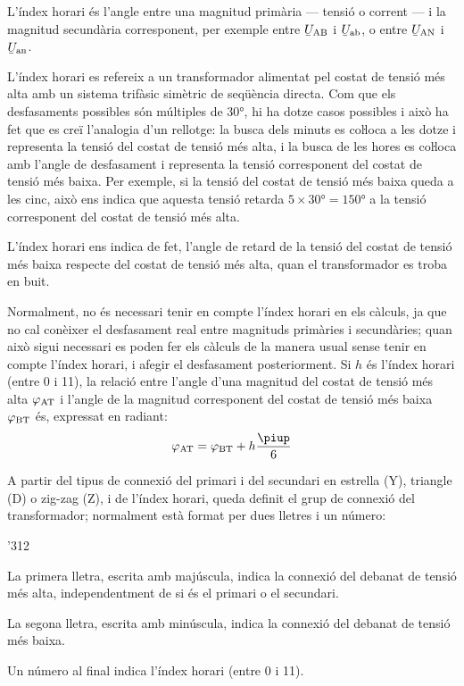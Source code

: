 L'índex horari és l'angle entre una magnitud  primària --- tensió o corrent --- i la magnitud secundària corresponent, per exemple entre $\cmplx{U}\ped{AB}$ i $\cmplx{U}\ped{ab}$, o entre $\cmplx{U}\ped{AN}$ i $\cmplx{U}\ped{an}$.

L'índex horari es refereix a un transformador alimentat pel costat de tensió més alta  amb un sistema trifàsic simètric de seqüència directa. Com que els desfasaments possibles són múltiples de \ang{30}, hi ha dotze casos possibles i això ha fet que es creï l'analogia d'un rellotge: la busca dels minuts es coŀloca a les dotze i representa la tensió del costat de tensió més alta, i la busca de les hores es coŀloca amb l'angle de desfasament i representa la tensió corresponent del costat de tensió més baixa. Per exemple, si la tensió del costat de tensió més baixa queda a les cinc, això ens indica que aquesta tensió retarda $5\times \ang{30}= \ang{150}$ a la tensió corresponent del costat de tensió més alta.

L'índex horari ens indica de fet, l'angle de retard de la tensió del costat de tensió més baixa respecte del costat de tensió més alta, quan el transformador es troba en buit.

Normalment, no és necessari tenir en compte l'índex horari en els càlculs, ja que no cal conèixer el desfasament real entre magnituds primàries i secundàries; quan això sigui necessari es poden fer els càlculs de la manera usual sense tenir en compte l'índex horari, i afegir el desfasament posteriorment. Si $h$ és l'índex horari (entre 0 i 11), la relació entre l'angle d'una magnitud del costat de tensió més alta $\varphi_\mathrm{AT}$ i l'angle de la magnitud corresponent del costat de tensió més baixa $\varphi_\mathrm{BT}$ és, expressat en radiant:
\begin{equation}
    \varphi\ped{AT} = \varphi\ped{BT} + h\frac{\piup}{6}\label{eq:fi-AT-BT}
\end{equation}


A partir del tipus de connexió del primari i del secundari en estrella (Y), triangle (D) o zig-zag (Z), i de l'índex horari, queda definit el grup de connexió del transformador; normalment està format per dues lletres i un número:
\begin{dingautolist}{'312}
   \item La primera lletra, escrita amb majúscula, indica la connexió del debanat de tensió més alta, independentment de si és el primari o el secundari.
   \item La segona lletra, escrita amb minúscula, indica la connexió del debanat de tensió més baixa.
   \item Un número al final indica l'índex horari (entre 0 i 11).
\end{dingautolist}

